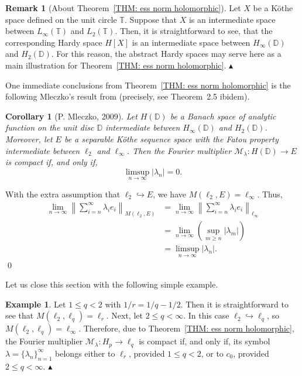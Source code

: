 \documentclass[11pt]{amsart}
\theoremstyle{definition}
\theoremstyle{definition}
\theoremstyle{definition}
\newtheorem{corollary}[theorem]{Corollary}
\theoremstyle{definition}
\theoremstyle{definition}
\theoremstyle{definition}
\newtheorem{remark}[theorem]{Remark}
\theoremstyle{definition}
\newtheorem{example}[theorem]{Example}
\theoremstyle{definition}
\numberwithin{equation}{section}
\numberwithin{equation}{section}
\numberwithin{equation}{section}
\theoremstyle{definition}
\theoremstyle{definition}
\theoremstyle{definition}
\theoremstyle{definition}
\theoremstyle{definition}
\theoremstyle{definition}
\newcommand{\norm}[1]{\left\lVert#1\right\rVert}
\newcommand{\abs}[1]{\left\lvert#1\right\rvert}
\renewenvironment{proof}{\noindent {\bf Proof.}}{\qed}
\newcommand\xqed[1]{%
	\leavevmode\unskip\penalty9999 \hbox{}\nobreak\hfill
	\quad\hbox{#1}}
\newcommand\demo{\xqed{{\Large $\blacktriangle$}}}
\begin{document}
\begin{remark}[About Theorem~\ref{THM: ess norm holomorphic}]
	Let $X$ be a K{\" o}the space defined on the unit circle $\mathbb{T}$.
	Suppose that $X$ is an intermediate space between $L_{\infty}(\mathbb{T})$ and $L_2(\mathbb{T})$.
	Then, it is straightforward to see, that the corresponding Hardy space $H[X]$ is an intermediate space between $H_{\infty}(\mathbb{D})$ and $H_2(\mathbb{D})$.
	For this reason, the abstract Hardy spaces may serve here as a main illustration for Theorem~\ref{THM: ess norm holomorphic}.
	\demo
\end{remark}

One immediate conclusions from Theorem~\ref{THM: ess norm holomorphic} is the following Mleczko's result from \cite{Mle09} (precisely, see Theorem~2.5 ibidem).

\begin{corollary}[P. Mleczko, 2009]
	{\it Let $H(\mathbb{D})$ be a Banach space of analytic function on the unit disc $\mathbb{D}$ intermediate between $H_{\infty}(\mathbb{D})$
		and $H_2(\mathbb{D})$. Moreover, let $E$ be a separable K{\" o}the sequence space with the Fatou property intermediate between
		$\ell_2$ and $\ell_{\infty}$. Then the Fourier multiplier $\mathscr{M}_{\lambda} \colon H(\mathbb{D}) \rightarrow E$ is compact if, and
		only if,
		\begin{equation*}
			\limsup_{n \rightarrow \infty} \abs{\lambda_n} = 0.
		\end{equation*}
	}
\end{corollary}
\begin{proof}
	With the extra assumption that $\ell_2 \hookrightarrow E$, we have $M(\ell_2,E) = \ell_{\infty}$. Thus,
	\begin{align*}
		\lim\limits_{n \rightarrow \infty} \norm{ \sum_{i=n}^{\infty} \lambda_i e_i }_{M(\ell_2,E)}
			& = \lim\limits_{n \rightarrow \infty} \norm{ \sum_{i=n}^{\infty} \lambda_i e_i }_{\ell_{\infty}} \\
			& = \lim\limits_{n \rightarrow \infty} \left( \sup_{m \geqslant n} \abs{\lambda_m} \right) \\
			& = \limsup_{n \rightarrow \infty} \abs{\lambda_n}.
	\end{align*}
\end{proof}

Let us close this section with the following simple example.

\begin{example}
	Let $1 \leqslant q < 2$ with $1/r = 1/q - 1/2$. Then it is straightforward to see that $M(\ell_2,\ell_q) = \ell_r$.
	Next, let $2 \leqslant q < \infty$. In this case $\ell_2 \hookrightarrow \ell_q$, so $M(\ell_2, \ell_q) = \ell_{\infty}$.
	Therefore, due to Theorem~\ref{THM: ess norm holomorphic}, the Fourier multiplier $\mathscr{M}_{\lambda} \colon H_p \rightarrow \ell_q$
	is compact if, and only if, its symbol $\lambda = \{\lambda_n\}_{n=1}^{\infty}$ belongs either to $\ell_r$, provided
	$1 \leqslant q < 2$, or to $c_0$, provided $2 \leqslant q < \infty$.
	\demo
\end{example}
\end{document}
